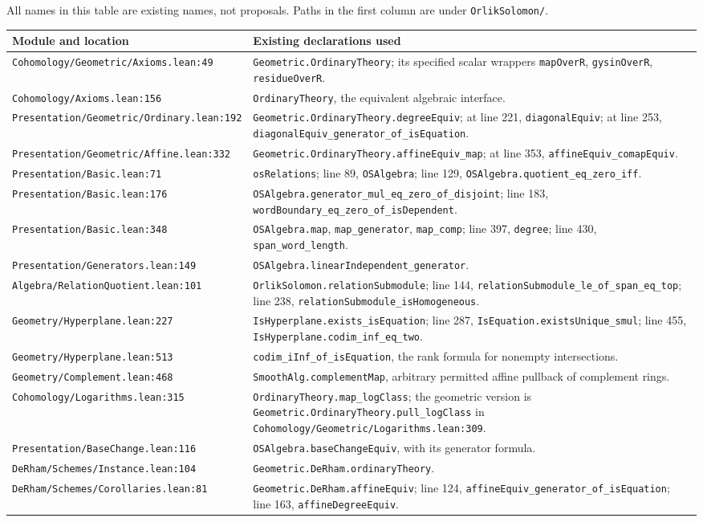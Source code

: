 \documentclass[11pt]{article}
\theoremstyle{remark}\newtheorem{remark}[theorem]{Remark}
\newcommand{\code}[1]{\nolinkurl{#1}}
\begin{document}
All names in this table are existing names, not proposals. Paths in
the first column are under \code{OrlikSolomon/}.
\small
\begin{longtable}{@{}p{}p{}@{}}
\toprule Module and location & Existing declarations used\\\midrule\endhead
\code{Cohomology/Geometric/Axioms.lean:49}&
\code{Geometric.OrdinaryTheory}; its specified scalar wrappers
\code{mapOverR}, \code{gysinOverR}, \code{residueOverR}.\\
\code{Cohomology/Axioms.lean:156}&
\code{OrdinaryTheory}, the equivalent algebraic interface.\\
\code{Presentation/Geometric/Ordinary.lean:192}&
\code{Geometric.OrdinaryTheory.degreeEquiv}; at line 221,
\code{diagonalEquiv}; at line 253,
\code{diagonalEquiv_generator_of_isEquation}.\\
\code{Presentation/Geometric/Affine.lean:332}&
\code{Geometric.OrdinaryTheory.affineEquiv_map}; at line 353,
\code{affineEquiv_comapEquiv}.\\
\code{Presentation/Basic.lean:71}&
\code{osRelations}; line 89, \code{OSAlgebra}; line 129,
\code{OSAlgebra.quotient_eq_zero_iff}.\\
\code{Presentation/Basic.lean:176}&
\code{OSAlgebra.generator_mul_eq_zero_of_disjoint}; line 183,
\code{wordBoundary_eq_zero_of_isDependent}.\\
\code{Presentation/Basic.lean:348}&
\code{OSAlgebra.map}, \code{map_generator}, \code{map_comp};
line 397, \code{degree}; line 430, \code{span_word_length}.\\
\code{Presentation/Generators.lean:149}&
\code{OSAlgebra.linearIndependent_generator}.\\
\code{Algebra/RelationQuotient.lean:101}&
\code{OrlikSolomon.relationSubmodule}; line 144,
\code{relationSubmodule_le_of_span_eq_top}; line 238,
\code{relationSubmodule_isHomogeneous}.\\
\code{Geometry/Hyperplane.lean:227}&
\code{IsHyperplane.exists_isEquation}; line 287,
\code{IsEquation.existsUnique_smul}; line 455,
\code{IsHyperplane.codim_inf_eq_two}.\\
\code{Geometry/Hyperplane.lean:513}&
\code{codim_iInf_of_isEquation}, the rank formula for nonempty
intersections.\\
\code{Geometry/Complement.lean:468}&
\code{SmoothAlg.complementMap}, arbitrary permitted affine pullback
of complement rings.\\
\code{Cohomology/Logarithms.lean:315}&
\code{OrdinaryTheory.map_logClass}; the geometric version is
\code{Geometric.OrdinaryTheory.pull_logClass} in
\code{Cohomology/Geometric/Logarithms.lean:309}.\\
\code{Presentation/BaseChange.lean:116}&
\code{OSAlgebra.baseChangeEquiv}, with its generator formula.\\
\code{DeRham/Schemes/Instance.lean:104}&
\code{Geometric.DeRham.ordinaryTheory}.\\
\code{DeRham/Schemes/Corollaries.lean:81}&
\code{Geometric.DeRham.affineEquiv}; line 124,
\code{affineEquiv_generator_of_isEquation}; line 163,
\code{affineDegreeEquiv}.\\\bottomrule
\end{longtable}
\normalsize
\end{document}
